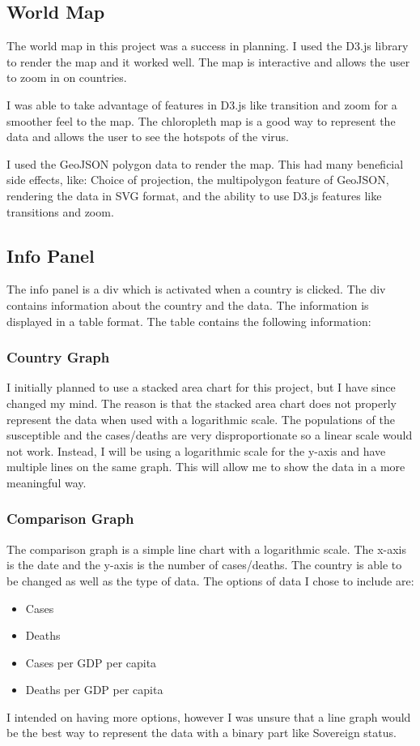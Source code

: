 \documentclass{report}
\begin{document}
\subsection{World Map}
The world map in this project was a success in planning. I used the D3.js library to render the map and it worked well. The map is interactive and allows the user to zoom in on countries.

I was able to take advantage of features in D3.js like transition and zoom for a smoother feel to the map. The chloropleth map is a good way to represent the data and allows the user to see the hotspots of the virus.

I used the GeoJSON polygon data to render the map. This had many beneficial side effects, like: Choice of projection, the multipolygon feature of GeoJSON, rendering the data in SVG format, and the ability to use D3.js features like transitions and zoom.

\subsection{Info Panel}
The info panel is a div which is activated when a country is clicked. The div contains information about the country and the data. The information is displayed in a table format. The table contains the following information:
\subsubsection{Country Graph}
I initially planned to use a stacked area chart for this project, but I have since changed my mind. The reason is that the stacked area chart does not properly represent the data when used with a logarithmic scale. The populations of the susceptible and the cases/deaths are very disproportionate so a linear scale would not work. Instead, I will be using a logarithmic scale for the y-axis and have multiple lines on the same graph. This will allow me to show the data in a more meaningful way.
\subsubsection{Comparison Graph}
The comparison graph is a simple line chart with a logarithmic scale. The x-axis is the date and the y-axis is the number of cases/deaths. The country is able to be changed as well as the type of data. The options of data I chose to include are:
\begin{itemize}
    \item Cases
    \item Deaths
    \item Cases per GDP per capita
    \item Deaths per GDP per capita
\end{itemize}
I intended on having more options, however I was unsure that a line graph would be the best way to represent the data with a binary part like Sovereign status.
\end{document}

